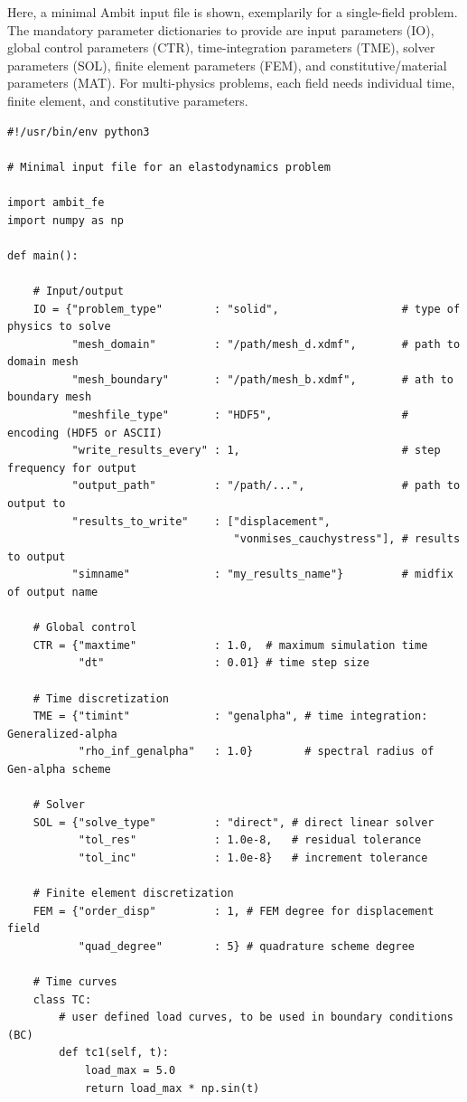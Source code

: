 \documentclass[a4paper,12pt]{report}
\begin{document}
Here, a minimal Ambit input file is shown, exemplarily for a single-field problem. The mandatory parameter dictionaries to provide are input parameters (IO), global control parameters (CTR), time-integration parameters (TME), solver parameters (SOL), finite element parameters (FEM), and constitutive/material parameters (MAT). For multi-physics problems, each field needs individual time, finite element, and constitutive parameters.

\begin{Verbatim}[breaklines=true]
#!/usr/bin/env python3

# Minimal input file for an elastodynamics problem

import ambit_fe
import numpy as np

def main():

    # Input/output
    IO = {"problem_type"        : "solid",                   # type of physics to solve
          "mesh_domain"         : "/path/mesh_d.xdmf",       # path to domain mesh
          "mesh_boundary"       : "/path/mesh_b.xdmf",       # ath to boundary mesh
          "meshfile_type"       : "HDF5",                    # encoding (HDF5 or ASCII)
          "write_results_every" : 1,                         # step frequency for output
          "output_path"         : "/path/...",               # path to output to
          "results_to_write"    : ["displacement",
                                   "vonmises_cauchystress"], # results to output
          "simname"             : "my_results_name"}         # midfix of output name
    
    # Global control
    CTR = {"maxtime"            : 1.0,  # maximum simulation time
           "dt"                 : 0.01} # time step size 
    
    # Time discretization  
    TME = {"timint"             : "genalpha", # time integration: Generalized-alpha
           "rho_inf_genalpha"   : 1.0}        # spectral radius of Gen-alpha scheme
    
    # Solver
    SOL = {"solve_type"         : "direct", # direct linear solver
           "tol_res"            : 1.0e-8,   # residual tolerance
           "tol_inc"            : 1.0e-8}   # increment tolerance
    
    # Finite element discretization
    FEM = {"order_disp"         : 1, # FEM degree for displacement field
           "quad_degree"        : 5} # quadrature scheme degree
    
    # Time curves
    class TC:
        # user defined load curves, to be used in boundary conditions (BC)
        def tc1(self, t):
            load_max = 5.0
            return load_max * np.sin(t)


\end{Verbatim}
\end{document}
